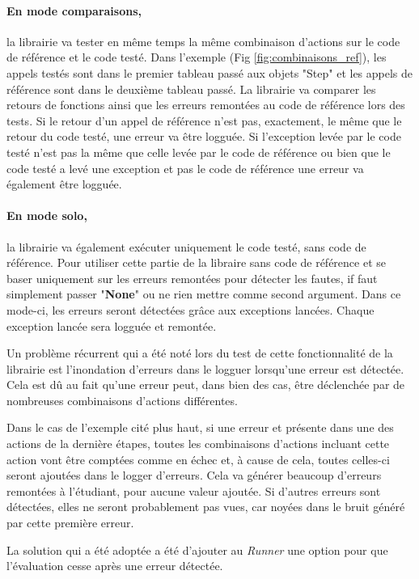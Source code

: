 \documentclass[a4paper]{report}
\begin{document}
\paragraph{En mode comparaisons,} la librairie va tester en même temps la même combinaison d'actions sur le code de référence et le code testé.
Dans l'exemple (Fig \ref{fig:combinaisons_ref}), les appels testés sont dans le premier tableau passé aux objets "Step" et les appels de référence sont dans le deuxième tableau passé.
La librairie va  comparer les retours de fonctions ainsi que les erreurs remontées au code de référence lors des tests.
Si le retour d'un appel de référence n'est pas, exactement, le même que le retour du code testé, une erreur va être logguée.
Si l'exception levée par le code testé n'est pas la même que celle levée par le code de référence ou bien que le code testé a levé une exception et pas le code de référence une erreur va également être logguée. 


\paragraph{En mode solo,} la librairie va également exécuter uniquement le code testé, sans code de référence.
Pour utiliser cette partie de la libraire sans code de référence et se baser uniquement sur les erreurs remontées pour détecter les fautes, if faut simplement passer "\textbf{None}" ou ne rien mettre comme second argument.
Dans ce mode-ci, les erreurs seront détectées grâce aux exceptions lancées.
Chaque exception lancée sera logguée et remontée.


Un problème récurrent qui a été noté lors du test de cette fonctionnalité de la librairie est l'inondation d'erreurs dans le logguer lorsqu’une erreur est détectée.
Cela est dû au fait qu'une erreur peut, dans bien des cas, être déclenchée par de nombreuses combinaisons d'actions différentes.

Dans le cas de l'exemple cité plus haut, si une erreur et présente dans une des actions de la dernière étapes, toutes les combinaisons d'actions incluant cette action vont être comptées comme en échec et, à cause de cela, toutes celles-ci seront ajoutées dans le logger d'erreurs.
Cela va générer beaucoup d'erreurs remontées à l'étudiant, pour aucune valeur ajoutée.
Si d'autres erreurs sont détectées, elles ne seront probablement pas vues, car noyées dans le bruit généré par cette première erreur.

La solution qui a été adoptée a été d'ajouter au \textit{Runner} une option pour que l'évaluation cesse après une erreur détectée.
\end{document}
